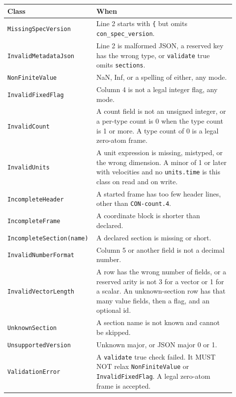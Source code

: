 \begin{center}
\footnotesize
\begin{tabular}{@{}p{0.32\linewidth}p{0.60\linewidth}@{}}
\toprule
\raggedright Class & \raggedright When \tabularnewline
\midrule
\raggedright \texttt{MissingSpecVersion} & \raggedright Line 2 starts with \texttt{\{} but omits
\texttt{con\_spec\_version}. \tabularnewline
\raggedright \texttt{InvalidMetadataJson} & \raggedright Line 2 is malformed JSON, a reserved key
has the wrong type, or \texttt{validate} true omits
\texttt{sections}. \tabularnewline
\raggedright \texttt{NonFiniteValue} & \raggedright NaN, Inf, or a spelling of either, any
mode. \tabularnewline
\raggedright \texttt{InvalidFixedFlag} & \raggedright Column 4 is not a legal integer flag, any
mode. \tabularnewline
\raggedright \texttt{InvalidCount} & \raggedright A count field is not an unsigned integer, or a
per-type count is 0 when the type count is 1 or more. A type count of 0
is a legal zero-atom frame. \tabularnewline
\raggedright \texttt{InvalidUnits} & \raggedright A unit expression is missing, mistyped, or the
wrong dimension. A minor of 1 or later with velocities and no
\texttt{units.time} is this class on read and on write. \tabularnewline
\raggedright \texttt{IncompleteHeader} & \raggedright A started frame has too few header lines,
other than \texttt{CON-count.4}. \tabularnewline
\raggedright \texttt{IncompleteFrame} & \raggedright A coordinate block is shorter than
declared. \tabularnewline
\raggedright \texttt{IncompleteSection(name)} & \raggedright A declared section is missing or
short. \tabularnewline
\raggedright \texttt{InvalidNumberFormat} & \raggedright Column 5 or another field is not a
decimal number. \tabularnewline
\raggedright \texttt{InvalidVectorLength} & \raggedright A row has the wrong number of fields, or
a reserved arity is not 3 for a vector or 1 for a scalar. An
unknown-section row has that many value fields, then a flag, and an
optional id. \tabularnewline
\raggedright \texttt{UnknownSection} & \raggedright A section name is not known and cannot be
skipped. \tabularnewline
\raggedright \texttt{UnsupportedVersion} & \raggedright Unknown major, or JSON major 0 or 1. \tabularnewline
\raggedright \texttt{ValidationError} & \raggedright A \texttt{validate} true check failed. It
MUST NOT relax \texttt{NonFiniteValue} or \texttt{InvalidFixedFlag}. A
legal zero-atom frame is accepted. \tabularnewline
\bottomrule
\end{tabular}
\end{center}

